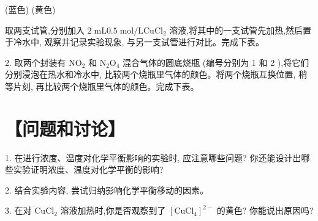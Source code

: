 \documentclass[10pt]{article}
\begin{document}
(蓝色) (黄色)

取两支试管,分别加入 \(2\mathrm{\;{mL}}{0.5}\mathrm{\;{mol}}/\mathrm{L}{\mathrm{{CuCl}}}_{2}\) 溶液,将其中的一支试管先加热,然后置于冷水中, 观察并记录实验现象, 与另一支试管进行对比。完成下表。

\begin{center}
\end{center}

2. 取两个封装有 \({\mathrm{{NO}}}_{2}\) 和 \({\mathrm{N}}_{2}{\mathrm{O}}_{4}\) 混合气体的圆底烧瓶 (编号分别为 1 和 2 ),将它们分别浸泡在热水和冷水中, 比较两个烧瓶里气体的颜色。将两个烧瓶互换位置, 稍等片刻, 再比较两个烧瓶里气体的颜色。完成下表。

\begin{center}
\end{center}

\section*{【问题和讨论】}

1. 在进行浓度、温度对化学平衡影响的实验时, 应注意哪些问题? 你还能设计出哪些实验证明浓度、温度对化学平衡的影响?

2. 结合实验内容, 尝试归纳影响化学平衡移动的因素。

3. 在对 \({\mathrm{{CuCl}}}_{2}\) 溶液加热时,你是否观察到了 \({\left\lbrack {\mathrm{{CuCl}}}_{4}\right\rbrack }^{2 - }\) 的黄色? 你能说出原因吗?
\end{document}
